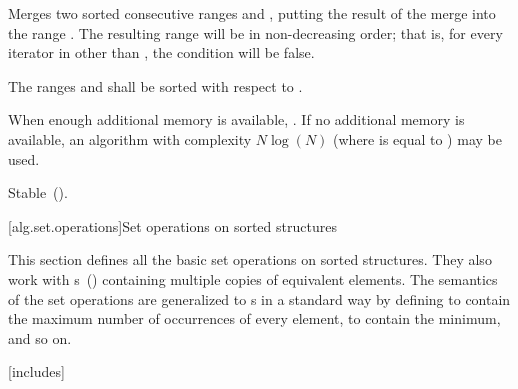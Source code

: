 \begin{itemdescr}
\pnum
\effects
Merges two sorted consecutive ranges
and
,
putting the result of the merge into the range
.
The resulting range will be in non-decreasing order;
that is, for every iterator
in
other than
,
the condition
will be false.

\pnum
\requires
The ranges  and  shall be
sorted with respect to  .

\begin{addedblock}
\pnum
\returns {}
\end{addedblock}

\pnum
\complexity
When enough additional memory is available,
.
If no additional memory is available, an algorithm with complexity
$N \log(N)$
(where
is equal to
)
may be used.

\pnum
\remarks Stable~().
\end{itemdescr}

[alg.set.operations]{Set operations on sorted structures}

\pnum
This section defines all the basic set operations on sorted structures.
They also work with
s~()
containing multiple copies of equivalent elements.
The semantics of the set operations are generalized to
s
in a standard way by defining
to contain the maximum number of occurrences of every element,
to contain the minimum, and so on.

[includes]{}

